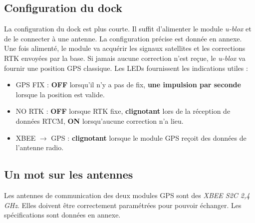 \documentclass[12pt]{report}
\begin{document}
\subsection{Configuration du dock}
La configuration du dock est plus courte. Il suffit d'alimenter le module \textit{u-blox} et de le connecter à une antenne. La configuration précise est donnée en annexe. Une fois alimenté, le module va acquérir les signaux satellites et les corrections RTK envoyées par la base. 
Si jamais aucune correction n'est reçue, le \textit{u-blox} va fournir une position GPS classique. Les LEDs fournissent les indications utiles : 
\begin{itemize}
    \item GPS FIX : \textbf{OFF} lorsqu'il n'y a pas de fix, \textbf{une impulsion par seconde} lorsque la position est valide.
    \item NO RTK : \textbf{OFF} lorsque RTK fixe, \textbf{clignotant} lors de la réception de données RTCM, \textbf{ON} lorsqu'aucune correction n'a lieu. 
    \item XBEE $\rightarrow$ GPS : \textbf{clignotant} lorsque le module GPS reçoit des données de l'antenne radio.
\end{itemize}

\subsection{Un mot sur les antennes}
Les antennes de communication des deux modules GPS sont des \textit{XBEE S2C 2,4 GHz}. Elles doivent être correctement paramétrées pour pouvoir échanger. 
Les spécifications sont données en annexe.
\end{document}
